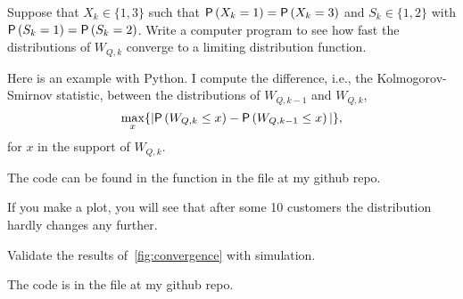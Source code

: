 \begin{exercise}
  Suppose that $X_k\in\{1,3\}$ such that $\P{X_k=1}=\P{X_k=3}$ and
  $S_k\in\{1,2\}$ with $\P{S_k=1}=\P{S_k=2}$. Write a computer program
  to see how fast the distributions of $W_{Q,k}$ converge to a limiting distribution function.
\begin{solution}
    Here is an example with Python.
    I compute the difference, i.e., the Kolmogorov-Smirnov statistic, between the distributions of $W_{Q,k-1}$ and $W_{Q,k}$,
\begin{equation*}
  \max_x\{ |\P{W_{Q,k}\leq x} - \P{W_{Q,k-1}\leq x}|\},
\end{equation*}
for $x$ in the support of $W_{Q,k}$. 

The code can be found in the  function in the file  at
my github repo.

If you make a plot, you will see that after some 10 customers the distribution hardly changes any further. 

\end{solution}
  \end{exercise}

\begin{exercise}
  Validate the results of~\cref{fig:convergence} with simulation.
\begin{solution}
    The code is in the file  at my github repo.
\end{solution}
\end{exercise}



